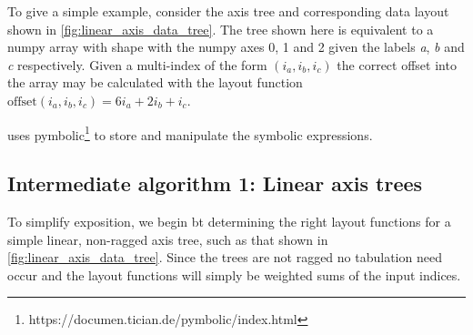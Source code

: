 \documentclass[thesis]{subfiles}
\begin{document}
To give a simple example, consider the axis tree and corresponding data layout shown in \cref{fig:linear_axis_data_tree}.
The tree shown here is equivalent to a numpy array with shape  with the numpy axes 0, 1 and 2 given the labels \textit{a}, \textit{b} and \textit{c} respectively.
Given a multi-index of the form $(i_a, i_b, i_c)$ the correct offset into the array may be calculated with the layout function $\textrm{offset}(i_a, i_b, i_c) = 6 i_a + 2 i_b + i_c$.

 uses pymbolic\footnote{https://documen.tician.de/pymbolic/index.html} to store and manipulate the symbolic expressions.


%
%

\subsection{Intermediate algorithm 1: Linear axis trees}

To simplify exposition, we begin bt determining the right layout functions for a simple linear, non-ragged axis tree, such as that shown in \cref{fig:linear_axis_data_tree}.
Since the trees are not ragged no tabulation need occur and the layout functions will simply be weighted sums of the input indices.
\end{document}
